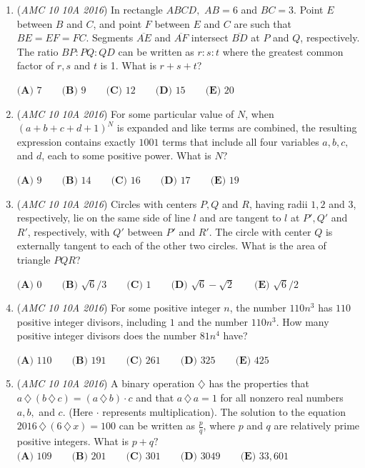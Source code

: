 \begin{enumerate}
 $\textbf{(A) } 1\qquad\textbf{(B) } 3\qquad\textbf{(C) }6 \qquad\textbf{(D) }12 \qquad\textbf{(E) }24$


	\item (\textit{AMC 10 10A 2016}) In rectangle $ABCD,$ $AB=6$ and $BC=3$. Point $E$ between $B$ and $C$, and point $F$ between $E$ and $C$ are such that $BE=EF=FC$. Segments $\overline{AE}$ and $\overline{AF}$ intersect $\overline{BD}$ at $P$ and $Q$, respectively. The ratio $BP:PQ:QD$ can be written as $r:s:t$ where the greatest common factor of $r,s$ and $t$ is 1. What is $r+s+t$?


 $\textbf{(A) } 7 \qquad \textbf{(B) } 9 \qquad \textbf{(C) } 12 \qquad \textbf{(D) } 15 \qquad \textbf{(E) } 20$


	\item (\textit{AMC 10 10A 2016}) For some particular value of $N$, when $(a+b+c+d+1)^N$ is expanded and like terms are combined, the resulting expression contains exactly $1001$ terms that include all four variables $a, b,c,$ and $d$, each to some positive power. What is $N$?


 $\textbf{(A) }9 \qquad \textbf{(B) } 14 \qquad \textbf{(C) } 16 \qquad \textbf{(D) } 17 \qquad \textbf{(E) } 19$


	\item (\textit{AMC 10 10A 2016}) Circles with centers $P, Q$ and $R$, having radii $1, 2$ and $3$, respectively, lie on the same side of line $l$ and are tangent to $l$ at $P', Q'$ and $R'$, respectively, with $Q'$ between $P'$ and $R'$. The circle with center $Q$ is externally tangent to each of the other two circles. What is the area of triangle $PQR$?


 $\textbf{(A) } 0\qquad \textbf{(B) } \sqrt{6}/3\qquad\textbf{(C) } 1\qquad\textbf{(D) } \sqrt{6}-\sqrt{2}\qquad\textbf{(E) }\sqrt{6}/2$


	\item (\textit{AMC 10 10A 2016}) For some positive integer $n$, the number $110n^3$ has $110$ positive integer divisors, including $1$ and the number $110n^3$. How many positive integer divisors does the number $81n^4$ have?


 $\textbf{(A) }110\qquad\textbf{(B) }191\qquad\textbf{(C) }261\qquad\textbf{(D) }325\qquad\textbf{(E) }425$


	\item (\textit{AMC 10 10A 2016}) A binary operation $\diamondsuit$ has the properties that $a\,\diamondsuit\, (b\,\diamondsuit \,c) = (a\,\diamondsuit \,b)\cdot c$ and that $a\,\diamondsuit \,a=1$ for all nonzero real numbers $a, b,$ and $c$. (Here $\cdot$ represents multiplication). The solution to the equation $2016 \,\diamondsuit\, (6\,\diamondsuit\, x)=100$ can be written as $\frac{p}{q}$, where $p$ and $q$ are relatively prime positive integers. What is $p+q?$
$\textbf{(A) }109\qquad\textbf{(B) }201\qquad\textbf{(C) }301\qquad\textbf{(D) }3049\qquad\textbf{(E) }33,601$



\end{enumerate}
